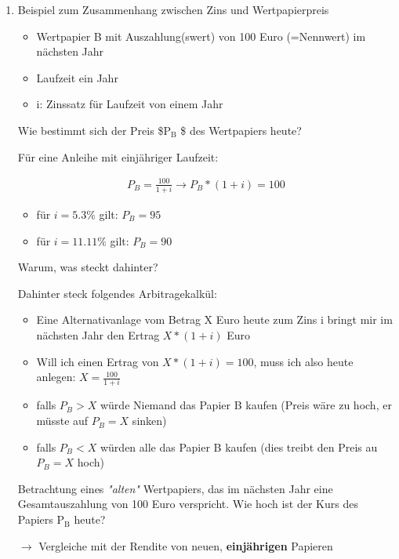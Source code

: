 \documentclass[11pt]{article}
\begin{document}
\begin{enumerate}
\item Beispiel zum Zusammenhang zwischen Zins und Wertpapierpreis
\label{sec:orgc02ab61}

\begin{itemize}
\item Wertpapier B mit Auszahlung(swert) von 100 Euro (=Nennwert) im nächsten Jahr
\item Laufzeit ein Jahr
\item i: Zinssatz für Laufzeit von einem Jahr
\end{itemize}

Wie bestimmt sich der Preis \$P\(_{\text{B}}\) \$ des Wertpapiers heute?

Für eine Anleihe mit einjähriger Laufzeit:

\begin{equation*}
\begin{aligned}
P_B = \frac{100}{1+i} \rightarrow P_B*(1+i)=100
\end{aligned}
\end{equation*}

\begin{itemize}
\item für \(i=5.3\%\) gilt: \(P_B = 95\)
\item für \(i=11.11\%\) gilt: \(P_B = 90\)
\end{itemize}

Warum, was steckt dahinter?

Dahinter steck folgendes Arbitragekalkül:
\begin{itemize}
\item Eine Alternativanlage vom Betrag X Euro heute zum Zins i bringt mir im nächsten Jahr den Ertrag \(X*(1+i)\) Euro
\item Will ich einen Ertrag von \(X*(1+i)=100\), muss ich also heute anlegen: \(X=\frac{100}{1+i}\)
\item falls \(P_B > X\) würde Niemand das Papier B kaufen (Preis wäre zu hoch, er müsste auf \(P_B = X\) sinken)
\item falls \(P_B < X\) würden alle das Papier B kaufen (dies treibt den Preis au \(P_B = X\) hoch)
\end{itemize}

Betrachtung eines \emph{"alten"} Wertpapiers, das im nächsten Jahr eine Gesamtauszahlung von 100 Euro verspricht. Wie hoch ist der Kurs des Papiers P\(_{\text{B}}\) heute?

\(\rightarrow\) Vergleiche mit der Rendite von neuen, \textbf{einjährigen} Papieren


\end{enumerate}
\end{document}

